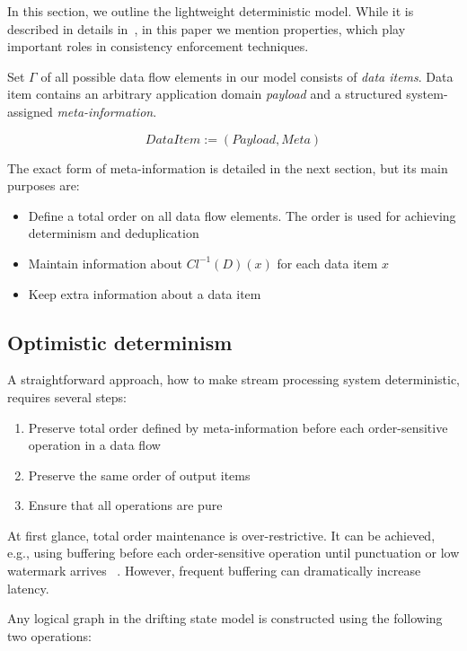 
\label {fs-model-section}

In this section, we outline the lightweight deterministic model. While it is described in details in~\cite{we2018adbis}, in this paper we mention properties, which play important roles in consistency enforcement techniques.

Set $\Gamma$ of all possible data flow elements in our model consists of {\em data items}. Data item contains an arbitrary application domain {\it payload} and a structured system-assigned {\it meta-information}.

\[DataItem := (Payload, Meta)\]

The exact form of meta-information is detailed in the next section, but its main purposes are:
\begin{itemize}
    \item Define a total order on all data flow elements. The order is used for achieving determinism and deduplication
    \item Maintain information about $Cl^{-1}(D)(x)$ for each data item $x$
    \item Keep extra information about a data item
\end{itemize}

\subsection{Optimistic determinism}

A straightforward approach, how to make stream processing system deterministic, requires several steps:
\begin{enumerate}
    \item Preserve total order defined by meta-information before each order-sensitive operation in a data flow
    \item Preserve the same order of output items
    \item Ensure that all operations are pure
\end{enumerate}

At first glance, total order maintenance is over-restrictive. It can be achieved, e.g., using buffering before each order-sensitive operation until punctuation or low watermark arrives ~\cite{Li:2008:OPN:1453856.1453890}. However, frequent buffering can dramatically increase latency. 

Any logical graph in the drifting state model is constructed using the following two operations:

